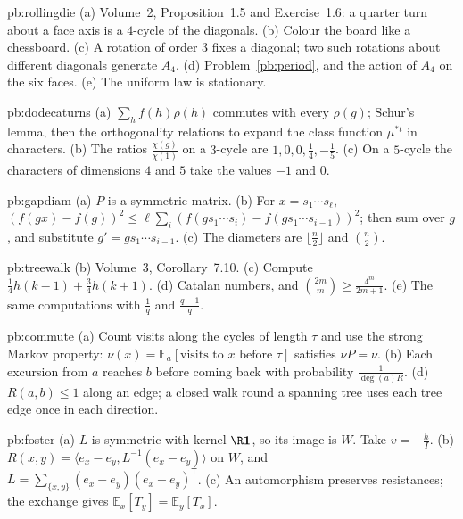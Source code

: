 \begin{hint}{pb:rollingdie}
(a) Volume~2, Proposition~1.5 and Exercise~1.6: a quarter turn about a face axis is a $4$-cycle of the diagonals. (b) Colour the board like a
chessboard. (c) A rotation of order $3$ fixes a diagonal; two such rotations about different diagonals generate $A_4$. (d) Problem~\ref{pb:period}, and
the action of $A_4$ on the six faces. (e) The uniform law is stationary.
\end{hint}

\begin{hint}{pb:dodecaturns}
(a) $\sum_hf(h)\rho(h)$ commutes with every $\rho(g)$; Schur's lemma, then the orthogonality relations to expand the class function $\mu^{*t}$ in
characters. (b) The ratios $\frac{\chi(g)}{\chi(1)}$ on a $3$-cycle are $1,0,0,\frac14,-\frac15$. (c) On a $5$-cycle the characters of dimensions $4$ and $5$ take the values
$-1$ and $0$.
\end{hint}

\begin{hint}{pb:gapdiam}
(a) $P$ is a symmetric matrix. (b) For $x=s_1\cdots s_\ell$, $(f(gx)-f(g))^2\le\ell\sum_i(f(gs_1\cdots s_i)-f(gs_1\cdots s_{i-1}))^2$; then sum over $g$, and substitute $g'=gs_1\cdots s_{i-1}$.
(c) The diameters are $\lfloor\frac n2\rfloor$ and $\binom n2$.
\end{hint}

\begin{hint}{pb:treewalk}
(b) Volume~3, Corollary~7.10. (c) Compute $\frac14h(k-1)+\frac34h(k+1)$. (d) Catalan numbers, and $\binom{2m}m\ge\frac{4^m}{2m+1}$. (e) The same computations with $\frac1q$ and $\frac{q-1}q$.
\end{hint}

\begin{hint}{pb:commute}
(a) Count visits along the cycles of length $\tau$ and use the strong Markov property: $\nu(x)=\mathbb E_a[\text{visits to }x\text{ before }\tau]$ satisfies $\nu P=\nu$. (b) Each
excursion from $a$ reaches $b$ before coming back with probability $\frac1{\deg(a)R}$. (d) $R(a,b)\le1$ along an edge; a closed walk round a
spanning tree uses each tree edge once in each direction.
\end{hint}

\begin{hint}{pb:foster}
(a) $L$ is symmetric with kernel $\R\mathbf1$, so its image is $W$. Take $v=-\frac hI$. (b) $R(x,y)=\langle e_x-e_y,L^{-1}(e_x-e_y)\rangle$ on $W$, and $L=\sum_{\{x,y\}}(e_x-e_y)(e_x-e_y)^{\mathsf T}$. (c) An
automorphism preserves resistances; the exchange gives $\mathbb E_x[T_y]=\mathbb E_y[T_x]$.
\end{hint}

